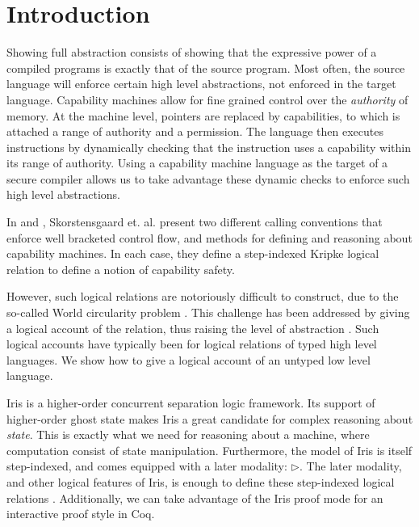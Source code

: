 \documentclass[sigplan,review]{acmart}\settopmatter{printfolios=true,printccs=false,printacmref=false}
\begin{document}
\section{Introduction}

Showing full abstraction consists of showing that the expressive power of a compiled programs is exactly that of the source program. Most often, the source language will enforce certain high level abstractions, not enforced in the target language. Capability machines allow for fine grained control over the \textit{authority} of memory. At the machine level, pointers are replaced by capabilities, to which is attached a range of authority and a permission. The language then executes instructions by dynamically checking that the instruction uses a capability within its range of authority. Using a capability machine language as the target of a secure compiler allows us to take advantage these dynamic checks to enforce such high level abstractions. 

In \cite{skorstengaardESOP18} and \cite{SkorstengaardPOPL19}, Skorstensgaard et. al. present two different calling conventions that enforce well bracketed control flow, and methods for defining and reasoning about capability machines. In each case, they define a step-indexed Kripke logical relation to define a notion of capability safety. 

However, such logical relations are notoriously difficult to construct, due to the so-called World circularity problem \cite{Ahmed2004SemanticsOT}. This challenge has been addressed by giving a logical account of the relation, thus raising the level of abstraction 
\cite{Krogh-Jespersen2017} \cite{dreyer_neis_birkedal_2012}. Such logical accounts have typically been for logical relations of typed high level languages. We show how to give a logical account of an untyped low level language. 

Iris is a higher-order concurrent separation logic framework. Its support of higher-order ghost state makes Iris a great candidate for complex reasoning about \textit{state}. This is exactly what we need for reasoning about a machine, where computation consist of state manipulation. Furthermore, the model of Iris is itself step-indexed, and comes equipped with a later modality: $\triangleright$. The later modality, and other logical features of Iris, is enough to define these step-indexed logical relations\cite{Timany:2017} \cite{Jung:2017} \cite{timany2019}. Additionally, we can take advantage of the Iris proof mode \cite{Krebbers:2017} for an interactive proof style in Coq. 
\end{document}
